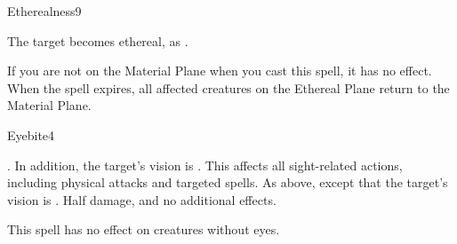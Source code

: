 \begin{spellsection}{Etherealness}{9}
    \begin{spellheader}
    \end{spellheader}
    \begin{spellcontent}
        \begin{spelltargetinginfo}
        \end{spelltargetinginfo}
        \begin{spelleffects}
            \spelleffect The target becomes ethereal, as .
        \end{spelleffects}
    \end{spellcontent}
    \begin{spellfooter}
        \spellnotes If you are not on the Material Plane when you cast this spell, it has no effect. When the spell expires, all affected creatures on the Ethereal Plane return to the Material Plane.
        \miscastexplode
    \end{spellfooter}
\end{spellsection}

\begin{spellsection}{Eyebite}{4}
    \begin{spellcontent}
        \begin{spelleffects}
            \spellsuccess {}. In addition, the target's vision is \impaired. This affects all sight-related actions, including physical attacks and targeted spells.
            \spellcritical As above, except that the target's vision is \severelyimpaired.
            \spellfailure Half damage, and no additional effects.
        \end{spelleffects}
    \end{spellcontent}
    \begin{spellfooter}
        \spellnotes This spell has no effect on creatures without eyes.
        \miscastrandom
    \end{spellfooter}
\end{spellsection}


